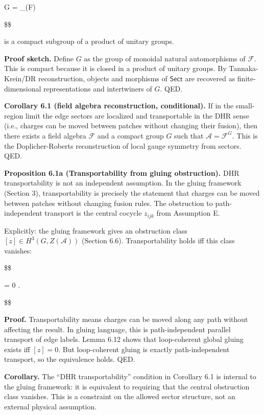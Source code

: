 \documentclass[11pt,a4paper]{article}
\theoremstyle{remark}
\begin{document}
G = \_\otimes(\mathcal F)

\$\$

is a compact subgroup of a product of unitary groups.

\textbf{Proof sketch.} Define \(G\) as the group of monoidal natural automorphisms
of \(\mathcal F\). This is compact because it is closed in a product of
unitary groups. By Tannaka-Krein/DR reconstruction, objects and morphisms
of \(\mathsf{Sect}\) are recovered as finite-dimensional representations and
intertwiners of \(G\). QED.

\textbf{Corollary 6.1 (field algebra reconstruction, conditional).} If in the
small-region limit the edge sectors are localized and transportable in the
DHR sense (i.e., charges can be moved between patches without changing
their fusion), then there exists a field algebra \(\mathcal F\) and a compact
group \(G\) such that \(\mathcal A = \mathcal F^G\). This is the
Doplicher-Roberts reconstruction of local gauge symmetry from sectors.
QED.

\textbf{Proposition 6.1a (Transportability from gluing obstruction).} DHR
transportability is not an independent assumption. In the gluing framework
(Section 3), transportability is precisely the statement that charges can
be moved between patches without changing fusion rules. The obstruction to
path-independent transport is the central cocycle \(z_{ijk}\) from
Assumption E.

Explicitly: the gluing framework gives an obstruction class
\([z] \in H^3(G, Z(\mathcal{A}))\) (Section 6.6). Transportability holds iff
this class vanishes:

\$\$

 \iff [z] = 0 \iff {}.

\$\$

\textbf{Proof.} Transportability means charges can be moved along any path
without affecting the result. In gluing language, this is path-independent
parallel transport of edge labels. Lemma 6.12 shows that loop-coherent
global gluing exists iff \([z] = 0\). But loop-coherent gluing is exactly
path-independent transport, so the equivalence holds. QED.

\textbf{Corollary.} The ``DHR transportability'' condition in Corollary 6.1 is
internal to the gluing framework: it is equivalent to requiring that the
central obstruction class vanishes. This is a constraint on the allowed
sector structure, not an external physical assumption.
\end{document}
